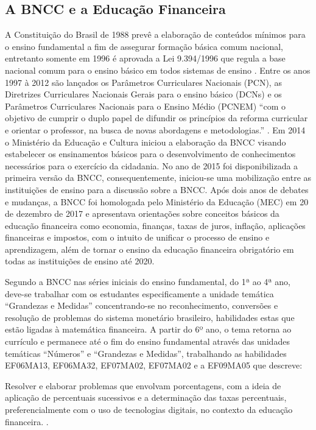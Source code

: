 \subsection{A BNCC e a Educação Financeira}
A Constituição do Brasil de 1988 prevê a elaboração de conteúdos mínimos para o ensino fundamental a fim de assegurar formação básica comum nacional, entretanto somente em 1996 é aprovada a Lei 9.394/1996 que regula a base nacional comum para o ensino básico em todos sistemas de ensino \cite{brasil1996}. Entre os anos 1997 à 2012 são lançados os Parâmetros Curriculares Nacionais (PCN), as Diretrizes Curriculares Nacionais Gerais para o ensino básico (DCNs) e os Parâmetros Curriculares Nacionais para o Ensino Médio (PCNEM) “com o objetivo de cumprir o duplo papel de difundir os princípios da reforma curricular e orientar o professor, na busca de novas abordagens e metodologias.” \cite{brasil2017b}. Em 2014 o Ministério da Educação e Cultura iniciou a elaboração da BNCC visando estabelecer os ensinamentos básicos para o desenvolvimento de conhecimentos necessários para o exercício da cidadania. No ano de 2015 foi disponibilizada a primeira versão da BNCC, consequentemente, iniciou-se uma mobilização entre as instituições de ensino para a discussão sobre a BNCC. Após dois anos de debates e mudanças, a BNCC foi homologada pelo Ministério da Educação (MEC) em 20 de dezembro de 2017 e apresentava orientações sobre conceitos básicos da educação financeira como economia, finanças, taxas de juros, inflação, aplicações financeiras e impostos, com o intuito de unificar o processo de ensino e aprendizagem, além de tornar o ensino da educação financeira obrigatório em todas as instituições de ensino até 2020.

Segundo a BNCC nas séries iniciais do ensino fundamental, do 1ª ao 4ª ano, deve-se trabalhar com os estudantes especificamente a unidade temática “Grandezas e Medidas” concentrando-se no reconhecimento, conversões e resolução de problemas do sistema monetário brasileiro, habilidades estas que estão ligadas à matemática financeira. A partir do 6º ano, o tema retorna ao currículo e permanece até o fim do ensino fundamental através das unidades temáticas “Números” e “Grandezas e Medidas”, trabalhando as habilidades EF06MA13, EF06MA32, EF07MA02, EF07MA02 e a EF09MA05 que descreve:

\begin{citacao}
Resolver e elaborar problemas que envolvam porcentagens, com a ideia de aplicação de percentuais sucessivos e a determinação das taxas percentuais, preferencialmente com o uso de tecnologias digitais, no contexto da educação financeira. \cite{brasil2017c}.
\end{citacao}

